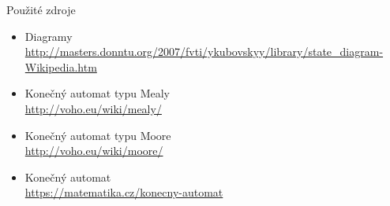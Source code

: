 \documentclass[11pt]{beamer}
\begin{document}
\begin{frame}{Použité zdroje}
\begin{itemize}
\item Diagramy\\ \vspace{0.5mm}
{\footnotesize \url{http://masters.donntu.org/2007/fvti/ykubovskyy/library/state_diagram-Wikipedia.htm}}
\item Konečný automat typu Mealy\\ \vspace{0.5mm}
{\footnotesize \url{http://voho.eu/wiki/mealy/}}
\item Konečný automat typu Moore\\ \vspace{0.5mm}
{\footnotesize \url{http://voho.eu/wiki/moore/}}
\item Konečný automat\\ \vspace{0.5mm}
{\footnotesize \url{https://matematika.cz/konecny-automat}}
\end{itemize}
\end{frame}
\end{document}
